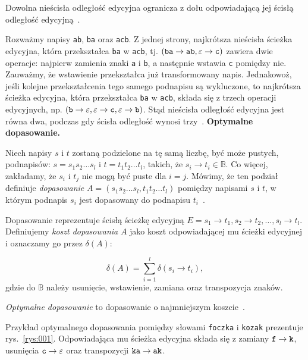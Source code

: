 \documentclass{praca1}
\begin{document}
\begin{lemma}
Dowolna nieścisła odległość edycyjna ogranicza z dołu odpowiadającą jej ścisłą odległość edycyjną~\cite{Boytsov2011:indexingmethods}.
\end{lemma}

Rozważmy napisy \verb|ab|, \verb|ba| oraz \verb|acb|. Z jednej strony, najkrótsza nieścisła ścieżka edycyjna, która przekształca \verb|ba| w \verb|acb|, tj. $(\verb|ba| \rightarrow \verb|ab|, \varepsilon \rightarrow \verb|c|)$ zawiera dwie operacje: najpierw zamienia znaki \verb|a| i \verb|b|, a następnie wstawia \verb|c| pomiędzy nie. Zauważmy, że wstawienie przekształca już transformowany napis. Jednakowoż, jeśli kolejne przekształcenia tego samego podnapisu są wykluczone, to najkrótsza ścieżka edycyjna, która przekształca \verb|ba| w \verb|acb|, składa się z trzech operacji edycyjnych, np. $(\verb|b| \rightarrow \varepsilon, \varepsilon \rightarrow \verb|c|, \varepsilon \rightarrow \verb|b|)$. Stąd nieścisła odległość edycyjna jest równa dwa, podczas gdy ścisła odległość wynosi trzy~\cite{Boytsov2011:indexingmethods}. 
\textbf{Optymalne dopasowanie.} 
\begin{definition}
Niech napisy $s$ i $t$ zostaną podzielone na tę samą liczbę, być może pustych, podnapisów: $s = s_1 s_2 \ldots s_l$ i $t = t_1 t_2 \ldots t_l$, takich, że $s_i \rightarrow t_i \in \mathbb{B}$. Co więcej, zakładamy, że $s_i$ i $t_j$ nie mogą być puste dla $i = j$. Mówimy, że ten podział definiuje \emph{dopasowanie} $A = (s_1 s_2\ldots s_l, t_1 t_2 \ldots t_l)$ pomiędzy napisami $s$ i $t$, w którym podnapis $s_i$ jest dopasowany do podnapisu $t_i$~\cite{Boytsov2011:indexingmethods}.
\end{definition}

Dopasowanie reprezentuje ścisłą ścieżkę edycyjną $E = s_1 \rightarrow t_1, s_2 \rightarrow t_2, \ldots, s_l \rightarrow t_l$. Definiujemy \emph{koszt dopasowania} $A$ jako koszt odpowiadającej mu ścieżki edycyjnej i oznaczamy go przez $\delta(A)$:

\begin{equation}
\label{eq:003}
\delta(A) = \sum\limits_{i = 1}^{l} \delta(s_i \rightarrow t_i),
\end{equation}
gdzie do $\mathbb{B}$ należy usunięcie, wstawienie, zamiana oraz transpozycja znaków.

\emph{Optymalne dopasowanie} to dopasowanie o najmniejszym koszcie~\cite{Boytsov2011:indexingmethods}.


\begin{example}
Przykład optymalnego dopasowania pomiędzy słowami \verb|foczka| i \verb|kozak| prezentuje rys.~\ref{rys:001}. Odpowiadająca mu ścieżka edycyjna składa się z zamiany $\verb|f| \rightarrow \verb|k|$, usunięcia $\verb|c| \rightarrow \varepsilon$ oraz transpozycji $\verb|ka| \rightarrow \verb|ak|$.
\end{example}
\end{document}
